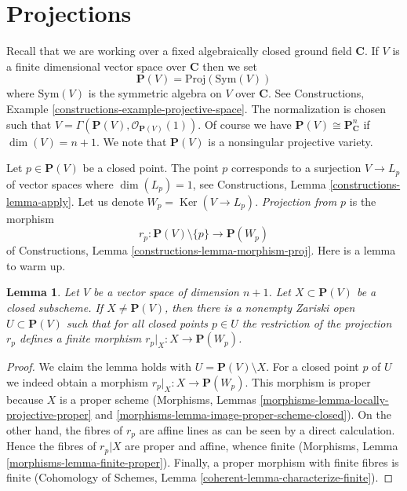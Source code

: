 \documentclass{stacks-project}
\theoremstyle{plain}
\newtheorem{lemma}[subsection]{Lemma}
\theoremstyle{definition}
\theoremstyle{remark}
\numberwithin{equation}{subsection}
\def\Ker{\mathop{\mathrm{Ker}}}
\begin{document}
\section{Projections}
\label{section-projection}

\noindent
Recall that we are working over a fixed algebraically closed ground field
$\mathbf{C}$. If $V$ is a finite dimensional vector space over $\mathbf{C}$
then we set
$$
\mathbf{P}(V) = \text{Proj}(\text{Sym}(V))
$$
where $\text{Sym}(V)$ is the symmetric algebra on $V$ over $\mathbf{C}$.
See Constructions, Example \ref{constructions-example-projective-space}.
The normalization is chosen such that
$V = \Gamma(\mathbf{P}(V), \mathcal{O}_{\mathbf{P}(V)}(1))$.
Of course we have $\mathbf{P}(V) \cong \mathbf{P}^n_{\mathbf{C}}$ if
$\dim(V) = n + 1$. We note that $\mathbf{P}(V)$ is a nonsingular projective
variety.

\medskip\noindent
Let $p \in \mathbf{P}(V)$ be a closed point. The point $p$ corresponds to a
surjection $V \to L_p$ of vector spaces where $\dim(L_p) = 1$, see
Constructions, Lemma \ref{constructions-lemma-apply}.
Let us denote $W_p = \Ker(V \to L_p)$.
{\it Projection from $p$} is the morphism
$$
r_p : \mathbf{P}(V) \setminus \{p\} \longrightarrow \mathbf{P}(W_p)
$$
of Constructions, Lemma \ref{constructions-lemma-morphism-proj}.
Here is a lemma to warm up.

\begin{lemma}
\label{lemma-projection-generically-finite}
Let $V$ be a vector space of dimension $n + 1$.
Let $X \subset \mathbf{P}(V)$ be a closed subscheme.
If $X \not = \mathbf{P}(V)$, then there is a nonempty Zariski open
$U \subset \mathbf{P}(V)$
such that for all closed points $p \in U$ the restriction
of the projection $r_p$ defines a finite morphism
$r_p|_X : X \to \mathbf{P}(W_p)$.
\end{lemma}

\begin{proof}
We claim the lemma holds with $U = \mathbf{P}(V) \setminus X$. For a closed
point $p$ of $U$ we indeed obtain a morphism $r_p|_X : X \to \mathbf{P}(W_p)$.
This morphism is proper because $X$ is a proper scheme
(Morphisms, Lemmas \ref{morphisms-lemma-locally-projective-proper} and
\ref{morphisms-lemma-image-proper-scheme-closed}). On the other hand, the
fibres of $r_p$ are affine lines as can be seen by a direct calculation.
Hence the fibres of $r_p|X$ are proper and affine, whence finite
(Morphisms, Lemma \ref{morphisms-lemma-finite-proper}).
Finally, a proper morphism with finite fibres is finite
(Cohomology of Schemes, Lemma \ref{coherent-lemma-characterize-finite}).
\end{proof}
\end{document}

